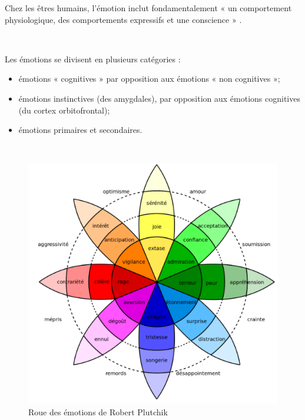 Chez les êtres humains, l'émotion inclut fondamentalement « un comportement physiologique, des comportements expressifs et une conscience » \parencite{myers2004theories}.

~\par
Les émotions se divisent en plusieurs catégories :

\begin{itemize}
\item émotions « cognitives » par opposition aux émotions « non cognitives »;
\item émotions instinctives (des amygdales), par opposition aux émotions cognitives (du cortex orbitofrontal);
\item émotions primaires et secondaires.
\end{itemize}

~\par

\begin{figure}[th]
\centering
\includegraphics{Figures/emotions.PNG}
\decoRule
\caption[Roue des émotions de Robert Plutchik]{Roue des émotions de Robert Plutchik}
\label{fig:roue}
\end{figure}


